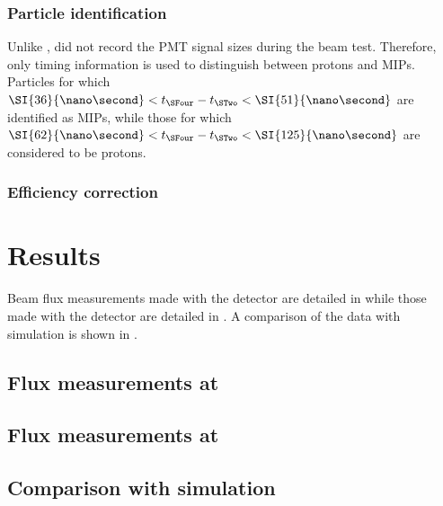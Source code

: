 \subsubsection{Particle identification}
\label{sec:hptpc_beam_flux:methods:s4:pid}

Unlike \SThree, \SFour did not record the PMT signal sizes during the beam test.
Therefore, only timing information is used to distinguish between protons and MIPs.
Particles for which $\SI{36}{\nano\second} < t_{\SFour} - t_{\STwo} < \SI{51}{\nano\second}$ are identified as MIPs, while those for which $\SI{62}{\nano\second} < t_{\SFour} - t_{\STwo} < \SI{125}{\nano\second}$ are considered to be protons.

\subsubsection{Efficiency correction}
\label{sec:hptpc_beam_flux:methods:s4:efficiency}

\section{Results}
\label{sec:hptpc_beam_flux:results}

Beam flux measurements made with the \SThree detector are detailed in  while those made with the \SFour detector are detailed in .
A comparison of the data with simulation is shown in .

\subsection{Flux measurements at \SThree}
\label{sec:hptpc_beam_flux:results:s3}

\subsection{Flux measurements at \SFour}
\label{sec:hptpc_beam_flux:results:s4}

\subsection{Comparison with simulation}
\label{sec:hptpc_beam_flux:results:MCData}

\begin{figure}[h]
  \begin{adjustbox}{max totalsize=.7\textwidth, center}
    
  \end{adjustbox}
  \caption[]{}
  \label{fig:tofS4Sim}
\end{figure}

